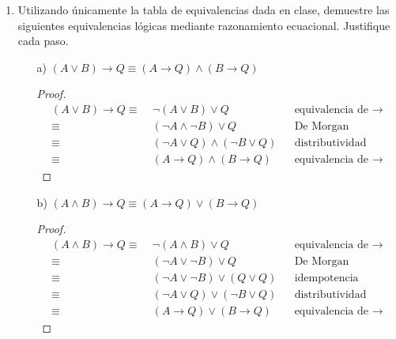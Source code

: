 \documentclass[letterpaper,11pt]{article}
\begin{document}
\begin{enumerate}
\begin{itemize}
        \item[b)] 
    \end{itemize}

    \item Utilizando únicamente la tabla de equivalencias dada en clase, 
    demuestre las siguientes equivalencias lógicas mediante razonamiento 
    ecuacional. Justifique cada paso.

    \begin{itemize}
        \item[a)] $(A \lor B) → Q ≡ (A → Q) \land (B → Q)$ 
        \begin{proof}
            \begin{align*}
                (A \lor B) → Q 
                ≡& \; \neg (A \lor B) \lor Q  
                && \text{equivalencia de $→$} \\
                ≡& \; (\neg A \land \neg B) \lor Q 
                && \text{De Morgan} \\ 
                ≡& \; (\neg A \lor Q) \land (\neg B \lor Q)
                && \text{distributividad} \\ 
                ≡& \; (A → Q) \land (B → Q)
                && \text{equivalencia de $→$} 
            \end{align*}
        \end{proof}

        \item[b)] $(A \land B) → Q ≡ (A → Q) \lor (B → Q)$ 
        \begin{proof}
            \begin{align*}
                (A \land B) → Q 
                ≡& \; \neg (A \land B) \lor Q
                && \text{equivalencia de $→$} \\ 
                ≡& \; (\neg A \lor \neg B) \lor Q
                && \text{De Morgan} \\
                ≡& \; (\neg A \lor \neg B) \lor (Q \lor Q)
                && \text{idempotencia} \\ 
                ≡& \; (\neg A \lor Q) \lor (\neg B \lor Q)
                && \text{distributividad} \\
                ≡& \; (A → Q) \lor (B → Q)
                && \text{equivalencia de $→$}
            \end{align*}
        \end{proof}


\end{itemize}
\end{enumerate}
\end{document}
